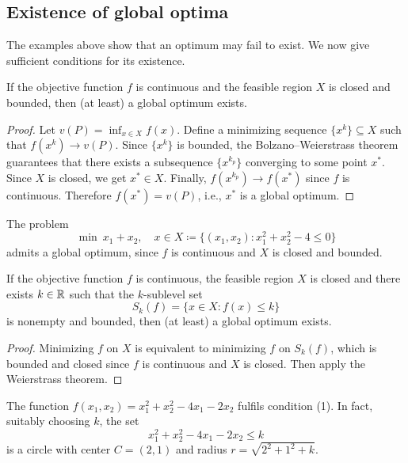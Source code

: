 \subsection{Existence of global optima}

The examples above show that an optimum may fail to exist. We now give sufficient conditions for its existence.

\begin{theorem}[Weierstrass]
If the objective function $f$ is continuous and the feasible region $X$ is closed and bounded, then (at least) a global optimum exists.
\end{theorem}
\begin{proof}
Let $v(P) = \inf_{x \in X} f(x)$. Define a minimizing sequence $\{x^k\} \subseteq X$ such that $f(x^k) \to v(P)$.
Since $\{x^k\}$ is bounded, the Bolzano--Weierstrass theorem guarantees that there exists a subsequence $\{x^{k_p}\}$ converging to some point $x^*$.
Since $X$ is closed, we get $x^* \in X$.
Finally, $f(x^{k_p}) \to f(x^*)$ since $f$ is continuous.
Therefore $f(x^*) = v(P)$, i.e., $x^*$ is a global optimum.
\end{proof}

\begin{example}
The problem
\[
    \min\ x_1 + x_2, \quad x \in X \coloneqq \{(x_1, x_2) : x_1^2 + x_2^2 - 4 \le 0\}
\]
admits a global optimum, since $f$ is continuous and $X$ is closed and bounded.
\end{example}

\begin{corollary}
If the objective function $f$ is continuous, the feasible region $X$ is closed and there exists $k \in \mathbb{R}$ such that the $k$-sublevel set
\[
    S_k(f) = \{x \in X : f(x) \le k\} \tag{1}
\]
is nonempty and bounded, then (at least) a global optimum exists.
\end{corollary}
\begin{proof}
Minimizing $f$ on $X$ is equivalent to minimizing $f$ on $S_k(f)$, which is bounded and closed since $f$ is continuous and $X$ is closed. Then apply the Weierstrass theorem.
\end{proof}

\begin{example}
The function $f(x_1, x_2) = x_1^2 + x_2^2 - 4x_1 - 2x_2$ fulfils condition (1).
In fact, suitably choosing $k$, the set
\[
    x_1^2 + x_2^2 - 4x_1 - 2x_2 \le k
\]
is a circle with center $C = (2, 1)$ and radius $r = \sqrt{2^2 + 1^2 + k}$.
\end{example}

